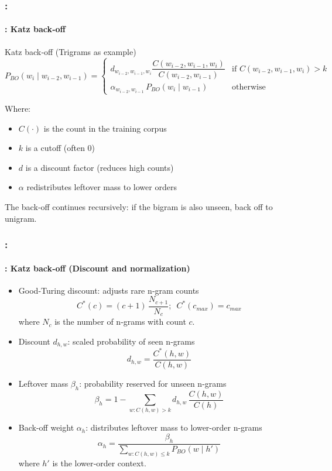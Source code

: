 \documentclass[xcolor=table]{beamer}
\begin{document}
\begin{frame}
	\frametitle{\insertshortsubtitle: \insertsection}
	\framesubtitle{\insertsubsection: Katz back‑off}
	
	\begin{block}{Katz back‑off (Trigrams as example)}
		\[
		P_{BO}(w_i \mid w_{i-2}, w_{i-1}) =
		\begin{cases}
			d_{w_{i-2},w_{i-1},w_i} \dfrac{C(w_{i-2},w_{i-1},w_i)}{C(w_{i-2},w_{i-1})}
			& \text{if } C(w_{i-2},w_{i-1},w_i) > k \\
			\alpha_{w_{i-2},w_{i-1}}\,P_{BO}(w_i \mid w_{i-1})
			& \text{otherwise}
		\end{cases}
		\]
		
		Where:
		\begin{itemize}
			\item $C(\cdot)$ is the count in the training corpus
			\item $k$ is a cutoff (often $0$)
			\item $d$ is a discount factor (reduces high counts)
			\item $\alpha$ redistributes leftover mass to lower orders
		\end{itemize}
		
		The back‑off continues recursively: if the bigram is also unseen, back off to unigram.
	\end{block}
	
	
\end{frame}

\begin{frame}
	\frametitle{\insertshortsubtitle: \insertsection}
	\framesubtitle{\insertsubsection: Katz back‑off (Discount and normalization)}
	
	\begin{itemize}
		\item Good‑Turing discount: adjusts rare n‑gram counts
		\[
		C^*(c) = (c+1)\,\frac{N_{c+1}}{N_c} ;\,\,\, C^*(c_{max}) = c_{max}
		\]
		where $N_c$ is the number of n‑grams with count $c$.
		
		\item Discount $d_{h,w}$: scaled probability of seen n‑grams
		\[
		d_{h,w} = \frac{C^*(h,w)}{C(h,w)}
		\]
		
		\item Leftover mass $\beta_h$: probability reserved for unseen n-grams
		\[
		\beta_h = 1 - \sum_{w: C(h,w)>k} d_{h,w}\,\frac{C(h,w)}{C(h)}
		\]
		
		\item Back-off weight $\alpha_h$: distributes leftover mass to lower-order n-grams
		\[
		\alpha_h = \frac{\beta_h}{\sum_{w: C(h,w)\le k} P_{BO}(w \mid h')}
		\]
		where $h'$ is the lower‑order context.
	\end{itemize}
	
\end{frame}
\end{document}
